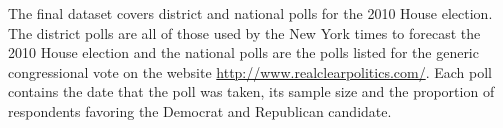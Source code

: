 \documentclass[12pt,final,fleqn]{article}
\theoremstyle{plain}
\begin{document}
The final dataset covers district and national polls for the 2010 House election. The district polls are all of those used by the New York times to forecast the 2010 House election and the national polls are the polls listed for the generic congressional vote on the website \url{http://www.realclearpolitics.com/}. Each poll contains the date that the poll was taken, its sample size and the proportion of respondents favoring the Democrat and Republican candidate. 



\end{document}

